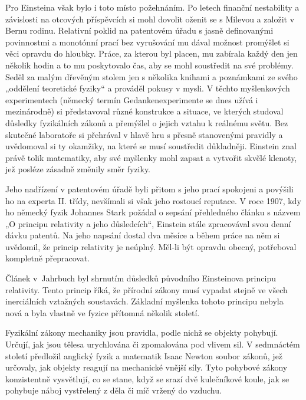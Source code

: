   Pro Einsteina však bylo i toto místo požehnáním. Po letech finanční nestability a závislosti na
  otcových příspěvcích si mohl dovolit oženit se s Milevou a založit v Bernu rodinu. Relativní
  poklid na patentovém úřadu s jasně definovanými povinnostmi a monotónní prací bez vyrušování mu
  dával možnost promýšlet si věci opravdu do hloubky. Práce, za kterou byl placen, mu zabírala každý
  den jen několik hodin a to mu poskytovalo čas, aby se mohl soustředit na své problémy. Seděl za
  malým dřevěným stolem jen s několika knihami a poznámkami ze svého „oddělení teoretické fyziky“ a
  prováděl pokusy v mysli. V těchto myšlenkových experimentech (německý termín Gedankenexperimente
  se dnes užívá i mezinárodně) si představoval různé konstrukce a situace, ve kterých studoval
  důsledky fyzikálních zákonů a přemýšlel o jejich vztahu k reálnému světu. Bez skutečné laboratoře
  si přehrával v hlavě hru s přesně stanovenými pravidly a uvědomoval si ty okamžiky, na které se
  musí soustředit důkladněji. Einstein znal právě tolik matematiky, aby své myšlenky mohl zapsat a
  vytvořit skvělé klenoty, jež posléze zásadně změnily směr fyziky. 

  Jeho nadřízení v patentovém úřadě byli přitom s jeho prací spokojeni a povýšili ho na experta II.
  třídy, nevšímali si však jeho rostoucí reputace. V roce 1907, kdy ho německý fyzik Johannes Stark
  požádal o sepsání přehledného článku s názvem „O principu relativity a jeho důsledcích“, Einstein
  stále zpracovával svou denní dávku patentů. Na jeho napsání dostal dva měsíce a během práce na něm
  si uvědomil, že princip relativity je neúplný. Měl-li být opravdu obecný, potřeboval kompletně
  přepracovat. 

  Článek v Jahrbuch byl shrnutím důsledků původního Einsteinova principu relativity. Tento princip
  říká, že přírodní zákony musí vypadat stejně ve všech inerciálních vztažných soustavách. Základní
  myšlenka tohoto principu nebyla nová a byla vlastně ve fyzice přítomná několik století.

  Fyzikální zákony mechaniky jsou pravidla, podle nichž se objekty pohybují. Určují, jak jsou tělesa
  urychlována či zpomalována pod vlivem sil. V sedmnáctém století předložil anglický fyzik a
  matematik Isaac Newton soubor zákonů, jež určovaly, jak objekty reagují na mechanické vnější síly.
  Tyto pohybové zákony konzistentně vysvětlují, co se stane, když se srazí dvě kulečníkové koule,
  jak se pohybuje náboj vystřelený z děla či míč vržený do vzduchu. 

